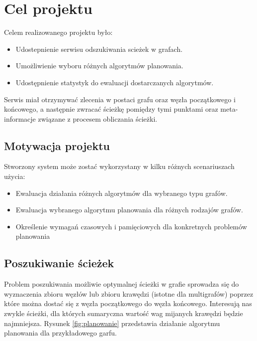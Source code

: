 \chapter{Cel projektu}

Celem realizowanego projektu było:

\begin{itemize}
	\item Udostepnienie serwisu odszukiwania scieżek w grafach.
	\item Umożliwienie wyboru różnych algorytmów planowania.
	\item Udostępnienie statystyk do ewaluacji dostarczanych algorytmów.
\end{itemize}

Serwis miał otrzymywać zlecenia w postaci grafu oraz węzła początkowego i końcowego, a następnie zwracać ścieżkę pomiędzy tymi punktami oraz meta-informacje związane z procesem obliczania ścieżki.

\section{Motywacja projektu}

Stworzony system może zostać wykorzystany w kilku różnych scenariuszach użycia:
\begin{itemize}
	\item Ewaluacja działania różnych algorytmów dla wybranego typu grafów.
	\item Ewaluacja wybranego algorytmu planowania dla różnych rodzajów grafów.
	\item Określenie wymagań czasowych i pamięciowych dla konkretnych problemów planowania
\end{itemize}

\section{Poszukiwanie ścieżek}

Problem poszukiwania możliwie optymalnej ścieżki w grafie sprowadza się do wyznaczenia zbioru węzłów lub zbioru krawędzi (istotne dla multigrafów) poprzez które można dostać się z węzła początkowego do węzła końcowego.
Interesują nas zwykle ścieżki, dla których sumaryczna wartość wag mijanych krawędzi będzie najmniejsza.
Rysunek \ref{fig:planowanie} przedstawia działanie algorytmu planowania dla przykładowego garfu.

